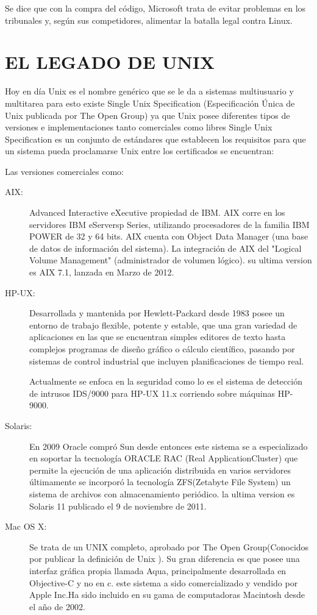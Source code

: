Se  dice  que  con  la compra del código, Microsoft trata de evitar problemas en los tribunales y, según sus competidores, alimentar la batalla legal contra Linux.


\section*{EL LEGADO DE UNIX}
Hoy en día Unix es el nombre genérico que se le da a sistemas multiusuario y multitarea para esto existe Single Unix Specification (Especificación Única de Unix publicada por The 
Open Group)   ya que Unix posee diferentes tipos de versiones e implementaciones tanto comerciales como libres Single Unix Specification es un conjunto de estándares que  
establecen los requisitos para que un sistema pueda proclamarse Unix entre los certificados se encuentran:
\begin{description}
	\item[Las versiones comerciales como:]
\end{description}

\begin{description}
	\item[AIX:]
		Advanced Interactive eXecutive propiedad de IBM. AIX corre en los servidores IBM eServersp Series, utilizando procesadores de la familia IBM POWER de 32 y 64 bits.
		AIX cuenta con Object Data Manager (una base de datos de información del sistema). La integración de AIX del "Logical Volume Management" (administrador de volumen lógico). 
		su ultima version es AIX 7.1, lanzada en Marzo de 2012.
	
	\item[HP-UX:]
		Desarrollada y mantenida por Hewlett-Packard desde 1983 posee un entorno de trabajo flexible, potente y estable, que una gran variedad de aplicaciones en las que se 	
		encuentran simples editores de texto hasta complejos programas de diseño gráfico o cálculo científico, pasando por sistemas de control industrial que incluyen 
		planificaciones de tiempo real.
		
		Actualmente se enfoca en la seguridad como lo es el sistema de detección de intrusos IDS/9000 para HP-UX 11.x corriendo sobre máquinas HP-9000.
		
	\item[Solaris:]
		En 2009 Oracle compró Sun desde entonces este sistema se a especializado en soportar la tecnología ORACLE RAC (Real ApplicationCluster)  que permite la ejecución de una 		
		aplicación distribuida en varios servidores últimamente se incorporó la tecnología  ZFS(Zetabyte File System) un sistema de archivos con almacenamiento periódico. 		
		la ultima version es Solaris 11 publicado el 9 de noviembre de 2011.
		
	\item[Mac OS X:]
		Se trata de un UNIX completo, aprobado por The Open Group(Conocidos por publicar la definición de Unix ). Su gran diferencia es que posee una interfaz gráfica propia  
		llamada Aqua, principalmente desarrollada en Objective-C y no en c. este sistema a sido  comercializado y vendido por Apple Inc.Ha sido incluido en su gama de computadoras 
		Macintosh desde el año de 2002.
\end{description}

